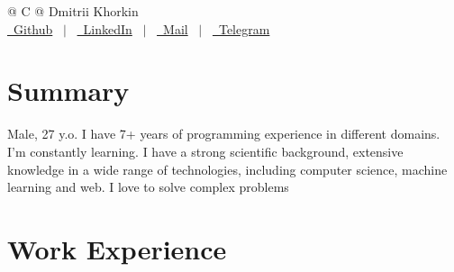 \documentclass[a4paper,12pt]{article}
\begin{document}
\pagestyle{empty} 



\begin{tabularx}{\linewidth}{@{} C @{}}
\Huge{Dmitrii Khorkin} \\[7.5pt]
\href{https://github.com/dimaamega}{\raisebox{-0.05\height}\faGithub\ Github} \ $|$ \ 
\href{https://linkedin.com/in/dmitry-khorkin}{\raisebox{-0.05\height}\faLinkedin\ LinkedIn} \ $|$ \ 
\href{mailto:dmitryhorkin@gmail.com}{\raisebox{-0.05\height}\faEnvelope \ Mail} \ $|$ \ 
\href{https://t.me/dkhrkn}{\raisebox{-0.05\height}\faTelegram \ Telegram} \
\end{tabularx}


\section{Summary}
Male, 27 y.o. I have 7+ years of programming experience in different domains.
I'm constantly learning. I have a strong scientific background, extensive knowledge in a wide
range of technologies, including computer science, machine learning and web.
I love to solve complex problems

\section{Work Experience}
\end{document}
